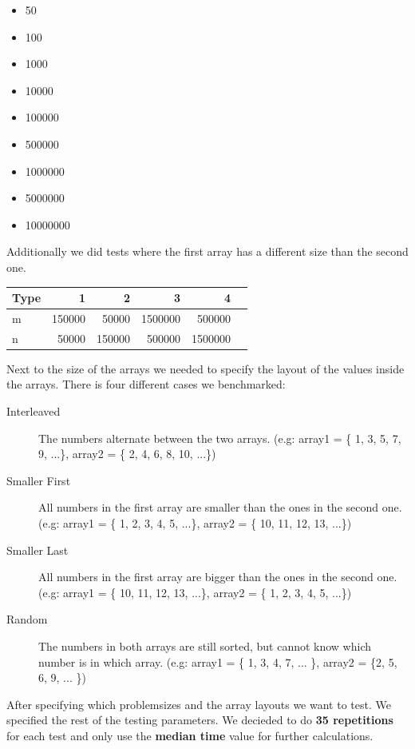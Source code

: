 \documentclass[12pt,a4paper,titlepage,oneside]{scrartcl}
\begin{document}
\begin{multicols}{3}
\begin{itemize}
\item 50
\item 100
\item 1000
\item 10000
\item 100000
\item 500000
\item 1000000
\item 5000000
\item 10000000
\end{itemize}
\end{multicols}

Additionally we did tests where the first array has a different size than the second one.
\begin{center}
\begin{tabular}{l | r | r | r | r | r}
\hline
 Type & 1 & 2 & 3 & 4 \\ \hline
 m & 150000 & 50000 & 1500000 & 500000 \\ \hline
 n & 50000 & 150000 & 500000 & 1500000 \\ \hline
\end{tabular}
\end{center}

Next to the size of the arrays we needed to specify the layout of the values inside the arrays.
There is four different cases we benchmarked:

\begin{description}
\item[Interleaved] The numbers alternate between the two arrays. (e.g: array1 = \{ 1, 3, 5, 7, 9, ...\}, array2 = \{ 2, 4, 6, 8, 10, ...\})
\item[Smaller First] All numbers in the first array are smaller than the ones in the second one. (e.g: array1 = \{ 1, 2, 3, 4, 5, ...\}, array2 = \{ 10, 11, 12, 13, ...\})
\item[Smaller Last] All numbers in the first array are bigger than the ones in the second one.  (e.g: array1 = \{ 10, 11, 12, 13, ...\}, array2 = \{ 1, 2, 3, 4, 5, ...\})
\item[Random] The numbers in both arrays are still sorted, but cannot know which number is in which array. (e.g: array1 = \{ 1, 3, 4, 7, ... \}, array2 = \{2, 5, 6, 9, ... \})
\end{description}

After specifying which problemsizes and the array layouts we want to test. We specified the rest of the testing parameters. We decieded to do \textbf{35 repetitions} for each test and only use the \textbf{median time} value for further calculations.
\end{document}
